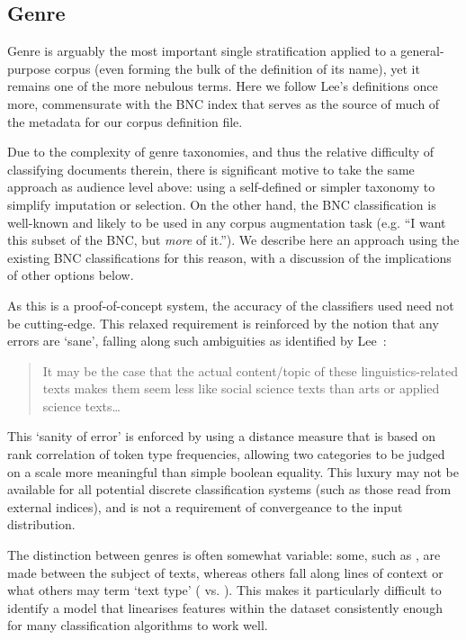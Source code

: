 \subsection{Genre}
\label{sec:evaluation:heuristics:genre}
Genre is arguably the most important single stratification applied to a general-purpose corpus (even forming the bulk of the definition of its name), yet it remains one of the more nebulous terms.  Here we follow Lee's definitions once more, commensurate with the BNC index that serves as the source of much of the metadata for our corpus definition file.

Due to the complexity of genre taxonomies, and thus the relative difficulty of classifying documents therein, there is significant motive to take the same approach as audience level above: using a self-defined or simpler taxonomy to simplify imputation or selection.  On the other hand, the BNC classification is well-known and likely to be used in any corpus augmentation task (e.g. ``I want this subset of the BNC, but \textsl{more} of it.'').  We describe here an approach using the existing BNC classifications for this reason, with a discussion of the implications of other options below.


As this is a proof-of-concept system, the accuracy of the classifiers used need not be cutting-edge.  This relaxed requirement is reinforced by the notion that any errors are `sane', falling along such ambiguities as identified by Lee~\cite[p.~11]{lee2003bnc}:

\begin{quote}
It may be the case that the actual content/topic of these linguistics-related texts makes them seem less like social science texts than arts or applied science texts\ldots
\end{quote}

This `sanity of error' is enforced by using a distance measure that is based on rank correlation of token type frequencies, allowing two categories to be judged on a scale more meaningful than simple boolean equality.  This luxury may not be available for all potential discrete classification systems (such as those read from external indices), and is not a requirement of convergeance to the input distribution.

The distinction between genres is often somewhat variable: some, such as , are made between the subject of texts, whereas others fall along lines of context or what others may term `text type' ( vs. ).  This makes it particularly difficult to identify a model that linearises features within the dataset consistently enough for many classification algorithms to work well.

